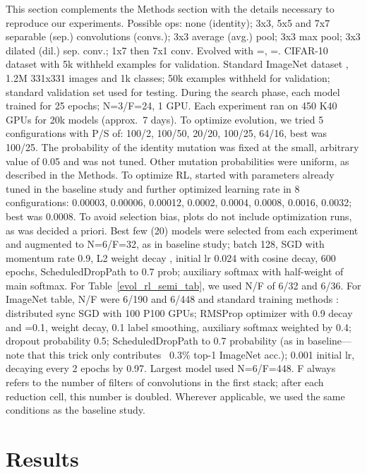 \documentclass[letterpaper]{article} \usepackage{aaai19}  \usepackage{times}  \usepackage{helvet}  \usepackage{courier}  \usepackage{graphicx}  \frenchspacing
\begin{document}
This section complements the Methods section with the details necessary to reproduce our experiments. Possible ops: none (identity); 3x3, 5x5 and 7x7 separable (sep.) convolutions (convs.); 3x3 average (avg.) pool; 3x3 max pool; 3x3 dilated (dil.) sep. conv.; 1x7 then 7x1 conv. Evolved with =, =. CIFAR-10 dataset \cite{krizhevsky2009learning} with 5k withheld examples for validation. Standard ImageNet dataset \cite{deng2009imagenet}, 1.2M 331x331 images and 1k classes; 50k examples withheld for validation; standard validation set used for testing. During the search phase, each model trained for 25 epochs; N=3/F=24, 1 GPU. Each experiment ran on 450 K40 GPUs for 20k models (approx.\ 7 days). To optimize evolution, we tried 5 configurations with P/S of: 100/2, 100/50, 20/20, 100/25, 64/16, best was 100/25. The probability of the identity mutation was fixed at the small, arbitrary value of 0.05 and was not tuned. Other mutation probabilities were uniform, as described in the Methods. To optimize RL, started with parameters already tuned in the baseline study and further optimized learning rate in 8 configurations: 0.00003, 0.00006, 0.00012, 0.0002, 0.0004, 0.0008, 0.0016, 0.0032; best was 0.0008. To avoid selection bias, plots do not include optimization runs, as was decided a priori. Best few (20) models were selected from each experiment and augmented to N=6/F=32, as in baseline study; batch 128, SGD with momentum rate 0.9, L2 weight decay , initial lr 0.024 with cosine decay, 600 epochs, ScheduledDropPath to 0.7 prob; auxiliary softmax with half-weight of main softmax. For Table~\ref{evol_rl_semi_tab}, we used N/F of 6/32 and 6/36. For ImageNet table, N/F were 6/190 and 6/448 and standard training methods \cite{szegedy2017inception}: distributed sync SGD with 100 P100 GPUs; RMSProp optimizer with 0.9 decay and =0.1,  weight decay, 0.1 label smoothing, auxiliary softmax weighted by 0.4; dropout probability 0.5; ScheduledDropPath to 0.7 probability (as in baseline---note that this trick only contributes ~0.3\% top-1 ImageNet acc.); 0.001 initial lr, decaying every 2 epochs by 0.97. Largest model used N=6/F=448. F always refers to the number of filters of convolutions in the first stack; after each reduction cell, this number is doubled. Wherever applicable, we used the same conditions as the baseline study.


\section{Results}
\end{document}
